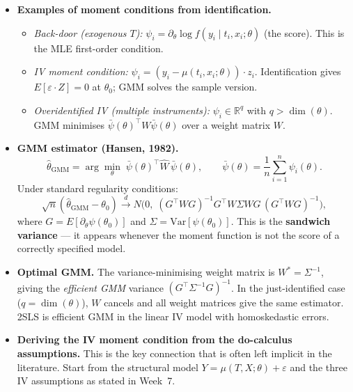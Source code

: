 \documentclass[12pt]{article}
\begin{document}
\begin{itemize}
  \item \textbf{Examples of moment conditions from identification.}
    \begin{itemize}
      \item \emph{Back-door (exogenous $T$):}
        $\psi_i = \partial_\theta \log f(y_i \mid t_i, x_i;\theta)$
        (the score).  This is the MLE first-order condition.
      \item \emph{IV moment condition:}
        $\psi_i = (y_i - \mu(t_i, x_i;\theta))\cdot z_i$.
        Identification gives $E[\varepsilon \cdot Z] = 0$ at $\theta_0$;
        GMM solves the sample version.
      \item \emph{Overidentified IV (multiple instruments):}
        $\psi_i \in \mathbb{R}^q$ with $q > \dim(\theta)$.
        GMM minimises $\bar\psi(\theta)^\top W \bar\psi(\theta)$ over
        a weight matrix $W$.
    \end{itemize}

  \item \textbf{GMM estimator (Hansen, 1982).}
    \[
      \hat\theta_{\mathrm{GMM}}
      = \arg\min_\theta\;
        \bar\psi(\theta)^\top \hat W\, \bar\psi(\theta),
        \qquad
        \bar\psi(\theta) = \frac{1}{n}\sum_{i=1}^n \psi_i(\theta).
    \]
    Under standard regularity conditions:
    \[
      \sqrt{n}(\hat\theta_{\mathrm{GMM}} - \theta_0)
      \xrightarrow{d} N\!\bigl(0,\; (G^\top W G)^{-1}
        G^\top W \Sigma W G\, (G^\top W G)^{-1}\bigr),
    \]
    where $G = E[\partial_\theta \psi(\theta_0)]$ and
    $\Sigma = \mathrm{Var}[\psi(\theta_0)]$.
    This is the \textbf{sandwich variance} --- it appears whenever the
    moment function is not the score of a correctly specified model.

  \item \textbf{Optimal GMM.}
    The variance-minimising weight matrix is $W^* = \Sigma^{-1}$, giving
    the \emph{efficient GMM} variance $(G^\top \Sigma^{-1} G)^{-1}$.
    In the just-identified case ($q = \dim(\theta)$), $W$ cancels and
    all weight matrices give the same estimator.  2SLS is efficient GMM
    in the linear IV model with homoskedastic errors.

  \item \textbf{Deriving the IV moment condition from the do-calculus
    assumptions.}
    This is the key connection that is often left implicit in the
    literature.  Start from the structural model
    $Y = \mu(T, X;\theta) + \varepsilon$ and the three IV assumptions
    as stated in Week~7.


\end{itemize}
\end{document}
